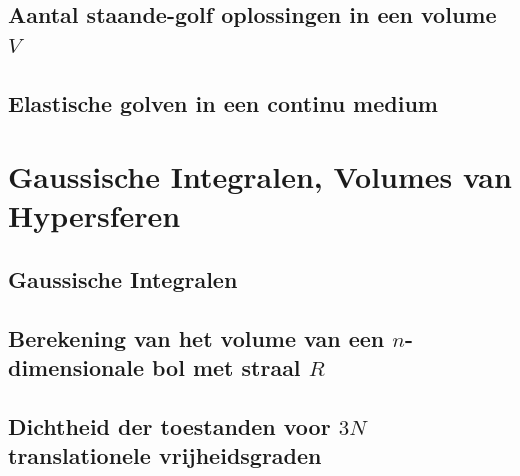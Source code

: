 \documentclass[a4paper,twoside]{article}
\theoremstyle{definition}
\theoremstyle{plain}
\begin{document}
\subsection{Aantal staande-golf oplossingen in een volume $V$}
\subsection{Elastische golven in een continu medium}

\section{Gaussische Integralen, Volumes van Hypersferen}
\subsection{Gaussische Integralen}
\subsection{Berekening van het volume van een $n$-dimensionale bol met straal $R$}
\subsection{Dichtheid der toestanden voor $3N$ translationele vrijheidsgraden}
\end{document}
